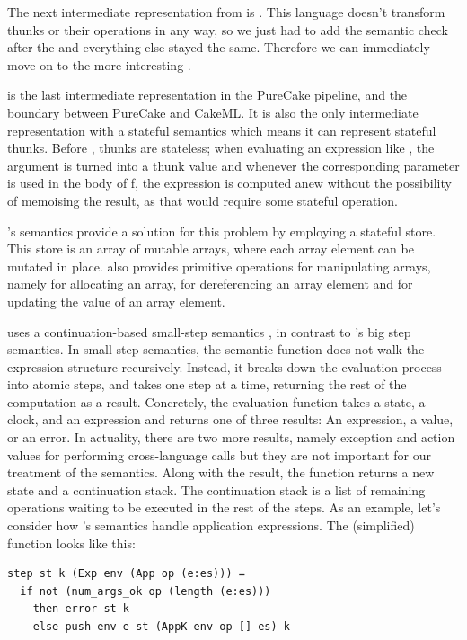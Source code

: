 The next intermediate representation from \ThunkLang{} is \EnvLang{}. This
language doesn't transform thunks or their operations in any way, so we just had
to add the semantic check after the  and everything else stayed the
same. Therefore we can immediately move on to the more interesting \StateLang{}.

\StateLang{} is the last intermediate representation in the PureCake pipeline,
and the boundary between PureCake and CakeML. It is also the only intermediate
representation with a stateful semantics which means it can represent stateful
thunks. Before \StateLang{}, thunks are stateless; when evaluating an expression
like , the argument  is turned into a thunk value and
whenever the corresponding parameter is used in the body of f, the expression
 is computed anew without the possibility of memoising the result, as
that would require some stateful operation.

\StateLang{}'s semantics provide a solution for this problem by employing a
stateful store. This store is an array of mutable arrays, where each array
element can be mutated in place. \StateLang{} also provides primitive operations
for manipulating arrays, namely  for allocating an array, 
for dereferencing an array element and  for updating the value of an
array element.

\StateLang{} uses a continuation-based small-step semantics
\cite{nakata2009small}, in contrast to \ThunkLang{}'s big step semantics. In
small-step semantics, the semantic function does not walk the expression
structure recursively. Instead, it breaks down the evaluation process into
atomic steps, and takes one step at a time, returning the rest of the
computation as a result. Concretely, the evaluation function takes a state, a
clock, and an expression and returns one of three results: An expression, a
value, or an error. In actuality, there are two more results, namely exception
and action values for performing cross-language calls but they are not important
for our treatment of the semantics. Along with the result, the 
function returns a new state and a continuation stack. The continuation stack is
a list of remaining operations waiting to be executed in the rest of the steps.
As an example, let's consider how \StateLang{}'s semantics handle application
expressions. The (simplified)  function looks like this:

\begin{verbatim}
step st k (Exp env (App op (e:es))) =
  if not (num_args_ok op (length (e:es)))
    then error st k
    else push env e st (AppK env op [] es) k
\end{verbatim}

